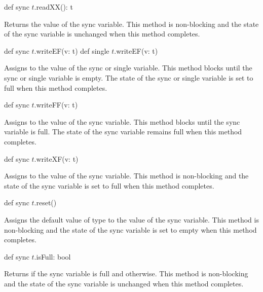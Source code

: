 \begin{protohead}
def sync $t$.readXX(): t
\end{protohead}
\begin{protobody}
Returns the value of the sync variable.  This method is non-blocking
and the state of the sync variable is unchanged when this method
completes.
\end{protobody}

\begin{protohead}
def sync $t$.writeEF(v: t)
def single $t$.writeEF(v: t)
\end{protohead}
\begin{protobody}
Assigns  to the value of the sync or single variable.  This
method blocks until the sync or single variable is empty.  The state
of the sync or single variable is set to full when this method
completes.
\end{protobody}

\begin{protohead}
def sync $t$.writeFF(v: t)
\end{protohead}
\begin{protobody}
Assigns  to the value of the sync variable.  This method
blocks until the sync variable is full.  The state of the sync
variable remains full when this method completes.
\end{protobody}

\begin{protohead}
def sync $t$.writeXF(v: t)
\end{protohead}
\begin{protobody}
Assigns  to the value of the sync variable.  This method is
non-blocking and the state of the sync variable is set to full when
this method completes.
\end{protobody}

\begin{protohead}
def sync $t$.reset()
\end{protohead}
\begin{protobody}
Assigns the default value of type  to the value of the sync
variable.  This method is non-blocking and the state of the sync
variable is set to empty when this method completes.
\end{protobody}

\begin{protohead}
def sync $t$.isFull: bool
\end{protohead}
\begin{protobody}
Returns  if the sync variable is full and 
otherwise.  This method is non-blocking and the state of the sync
variable is unchanged when this method completes.
\end{protobody}

